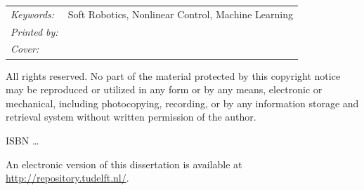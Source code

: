 \begin{titlepage}
\noindent
\begin{tabular}{@{}p{}@{}p{}}
  \textit{Keywords:} & Soft Robotics, Nonlinear Control, Machine Learning  \\[\medskipamount]
      \textit{Printed by:} &  \\[\medskipamount]
      \textit{Cover:} &  \\[\medskipamount]
\end{tabular}

\medskip
\medskip
\noindent All rights reserved. No part of the material protected by this copyright notice may be reproduced or utilized in any form or by any means, electronic or mechanical, including photocopying, recording, or by any information storage and retrieval system without written permission of the author.

\vspace{\bigskipamount}



\noindent ISBN \ldots

\medskip
\noindent An electronic version of this dissertation is available at \\
\url{http://repository.tudelft.nl/}.

\end{titlepage}

